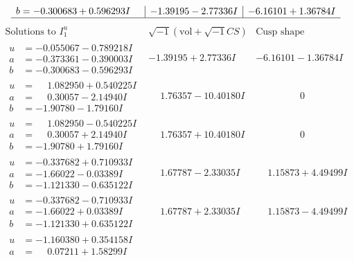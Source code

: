 \documentclass[1p]{elsarticle_modified}
\theoremstyle{definition}
\newcommand{\I}{\sqrt{-1}}
\begin{document}
$$\begin{array}{c|c|c}
\begin{aligned}
b &= -0.300683 + 0.596293 I\end{aligned}
 & -1.39195 - 2.77336 I & -6.16101 + 1.36784 I\\
 \hline 
 \end{array}$$\newpage$$\begin{array}{c|c|c}  
\text{Solutions to }I^u_{1}& \I (\text{vol} + \sqrt{-1}CS) & \text{Cusp shape}\\
 \hline 
\begin{aligned}
u &= -0.055067 - 0.789218 I \\
a &= -0.373361 - 0.390003 I \\
b &= -0.300683 - 0.596293 I\end{aligned}
 & -1.39195 + 2.77336 I & -6.16101 - 1.36784 I \\ \hline\begin{aligned}
u &= \phantom{-}1.082950 + 0.540225 I \\
a &= \phantom{-}0.30057 - 2.14940 I \\
b &= -1.90780 - 1.79160 I\end{aligned}
 & \phantom{-}1.76357 - 10.40180 I & \phantom{-0.000000 } 0 \\ \hline\begin{aligned}
u &= \phantom{-}1.082950 - 0.540225 I \\
a &= \phantom{-}0.30057 + 2.14940 I \\
b &= -1.90780 + 1.79160 I\end{aligned}
 & \phantom{-}1.76357 + 10.40180 I & \phantom{-0.000000 } 0 \\ \hline\begin{aligned}
u &= -0.337682 + 0.710933 I \\
a &= -1.66022 - 0.03389 I \\
b &= -1.121330 - 0.635122 I\end{aligned}
 & \phantom{-}1.67787 - 2.33035 I & \phantom{-}1.15873 + 4.49499 I \\ \hline\begin{aligned}
u &= -0.337682 - 0.710933 I \\
a &= -1.66022 + 0.03389 I \\
b &= -1.121330 + 0.635122 I\end{aligned}
 & \phantom{-}1.67787 + 2.33035 I & \phantom{-}1.15873 - 4.49499 I \\ \hline\begin{aligned}
u &= -1.160380 + 0.354158 I \\
a &= \phantom{-}0.07211 + 1.58299 I \\

\end{aligned}
\end{array}$$
\end{document}
